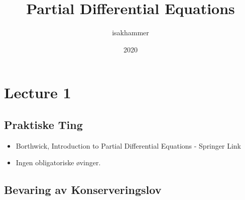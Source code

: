 \documentclass{article}
\title{Partial Differential Equations}
\author{isakhammer }
\date{2020}
\theoremstyle{remark}
\begin{document}
\maketitle
\tableofcontents
\newpage

\newpage
 \section{Lecture 1}%
 \label{sec:lecture_1}
  \subsection{Praktiske Ting}%
  \label{sub:book}

  \begin{itemize}
    \item
  Borthwick, Introduction to Partial Differential Equations - Springer Link
  \item Ingen obligatoriske øvinger.

  \end{itemize}

  \subsection{Bevaring av Konserveringslov}%
  \label{sub:bevaring_av_konserveringslov}
\end{document}
